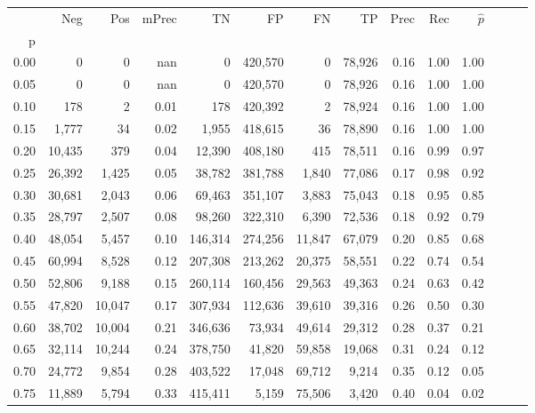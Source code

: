 \begin{tabular}{rrrrrrrrrrrrrr}
\toprule
{} &     Neg &     Pos & mPrec &       TN &       FP &      FN &      TP &  Prec &   Rec & $\hat{p}$ \\
p    &         &         &       &          &          &         &         &       &       &           \\
\midrule
0.00 &       0 &       0 &   nan &        0 &  420,570 &       0 &  78,926 &  0.16 &  1.00 &      1.00 \\
0.05 &       0 &       0 &   nan &        0 &  420,570 &       0 &  78,926 &  0.16 &  1.00 &      1.00 \\
0.10 &     178 &       2 &  0.01 &      178 &  420,392 &       2 &  78,924 &  0.16 &  1.00 &      1.00 \\
0.15 &   1,777 &      34 &  0.02 &    1,955 &  418,615 &      36 &  78,890 &  0.16 &  1.00 &      1.00 \\
0.20 &  10,435 &     379 &  0.04 &   12,390 &  408,180 &     415 &  78,511 &  0.16 &  0.99 &      0.97 \\
0.25 &  26,392 &   1,425 &  0.05 &   38,782 &  381,788 &   1,840 &  77,086 &  0.17 &  0.98 &      0.92 \\
0.30 &  30,681 &   2,043 &  0.06 &   69,463 &  351,107 &   3,883 &  75,043 &  0.18 &  0.95 &      0.85 \\
0.35 &  28,797 &   2,507 &  0.08 &   98,260 &  322,310 &   6,390 &  72,536 &  0.18 &  0.92 &      0.79 \\
0.40 &  48,054 &   5,457 &  0.10 &  146,314 &  274,256 &  11,847 &  67,079 &  0.20 &  0.85 &      0.68 \\
0.45 &  60,994 &   8,528 &  0.12 &  207,308 &  213,262 &  20,375 &  58,551 &  0.22 &  0.74 &      0.54 \\
0.50 &  52,806 &   9,188 &  0.15 &  260,114 &  160,456 &  29,563 &  49,363 &  0.24 &  0.63 &      0.42 \\
0.55 &  47,820 &  10,047 &  0.17 &  307,934 &  112,636 &  39,610 &  39,316 &  0.26 &  0.50 &      0.30 \\
0.60 &  38,702 &  10,004 &  0.21 &  346,636 &   73,934 &  49,614 &  29,312 &  0.28 &  0.37 &      0.21 \\
0.65 &  32,114 &  10,244 &  0.24 &  378,750 &   41,820 &  59,858 &  19,068 &  0.31 &  0.24 &      0.12 \\
0.70 &  24,772 &   9,854 &  0.28 &  403,522 &   17,048 &  69,712 &   9,214 &  0.35 &  0.12 &      0.05 \\
0.75 &  11,889 &   5,794 &  0.33 &  415,411 &    5,159 &  75,506 &   3,420 &  0.40 &  0.04 &      0.02 \\

\end{tabular}
